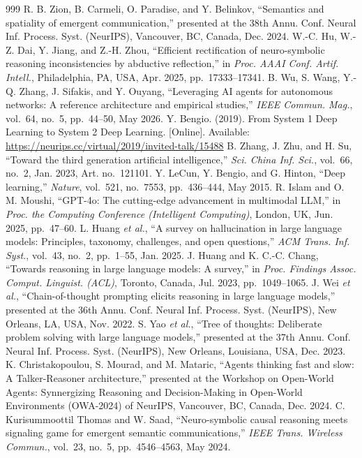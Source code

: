 \begin{thebibliography}{999}
 R. B. Zion, B. Carmeli, O. Paradise, and Y. Belinkov, ``Semantics and spatiality of emergent communication,'' presented at the 38th Annu. Conf. Neural Inf. Process. Syst. (NeurIPS), Vancouver, BC, Canada, Dec. 2024.
 W.-C. Hu, W.-Z. Dai, Y. Jiang, and Z.-H. Zhou, ``Efficient rectification of neuro-symbolic reasoning inconsistencies by abductive reflection,'' in \emph{Proc. AAAI Conf. Artif. Intell.}, Philadelphia, PA, USA, Apr. 2025, pp.~17333--17341.
 B. Wu, S. Wang, Y.-Q. Zhang, J. Sifakis, and Y. Ouyang, ``Leveraging AI agents for autonomous networks: A reference architecture and empirical studies,'' \emph{IEEE Commun. Mag.}, vol.~64, no.~5, pp.~44--50, May 2026.
 Y. Bengio. (2019). From System 1 Deep Learning to System 2 Deep Learning. [Online]. Available: \url{https://neurips.cc/virtual/2019/invited-talk/15488}
 B. Zhang, J. Zhu, and H. Su, ``Toward the third generation artificial intelligence,'' \emph{Sci. China Inf. Sci.}, vol.~66, no.~2, Jan. 2023, Art. no.~121101.
 Y. LeCun, Y. Bengio, and G. Hinton, ``Deep learning,'' \emph{Nature}, vol.~521, no.~7553, pp.~436--444, May 2015.
 R. Islam and O. M. Moushi, ``GPT-4o: The cutting-edge advancement in multimodal LLM,'' in \emph{Proc. the Computing Conference (Intelligent Computing)}, London, UK, Jun. 2025, pp.~47--60.
 L. Huang \emph{et al.}, ``A survey on hallucination in large language models: Principles, taxonomy, challenges, and open questions,'' \emph{ACM Trans. Inf. Syst.}, vol.~43, no.~2, pp.~1--55, Jan. 2025.
 J. Huang and K. C.-C. Chang, ``Towards reasoning in large language models: A survey,'' in \emph{Proc. Findings Assoc. Comput. Linguist. (ACL)}, Toronto, Canada, Jul. 2023, pp.~1049--1065.
 J. Wei \emph{et al.}, ``Chain-of-thought prompting elicits reasoning in large language models,'' presented at the 36th Annu. Conf. Neural Inf. Process. Syst. (NeurIPS), New Orleans, LA, USA, Nov. 2022.
 S. Yao \emph{et al.}, ``Tree of thoughts: Deliberate problem solving with large language models,'' presented at the 37th Annu. Conf. Neural Inf. Process. Syst. (NeurIPS), New Orleans, Louisiana, USA, Dec. 2023.
 K. Christakopoulou, S. Mourad, and M. Mataric, ``Agents thinking fast and slow: A Talker-Reasoner architecture,'' presented at the Workshop on Open-World Agents: Synnergizing Reasoning and Decision-Making in Open-World Environments (OWA-2024) of NeurIPS, Vancouver, BC, Canada, Dec. 2024.
 C. Kurisummoottil Thomas and W. Saad, ``Neuro-symbolic causal reasoning meets signaling game for emergent semantic communications,'' \emph{IEEE Trans. Wireless Commun.}, vol.~23, no.~5, pp.~4546--4563, May 2024.

\end{thebibliography}

